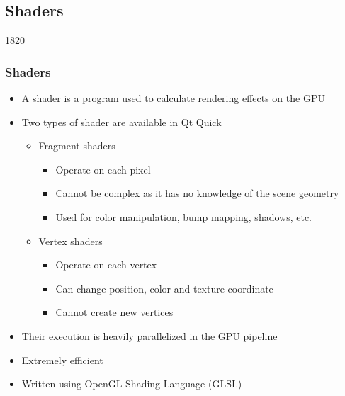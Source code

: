 %
%
%
%

\subsection{Shaders}


\begin{slide}{1820}\frametitle{Shaders}

\begin{itemize}
\item A shader is a program used to calculate rendering effects on the GPU
\vspace*{1em}
\item Two types of shader are available in Qt Quick
  \begin{itemize}
  \vspace*{0.5em}
  \item Fragment shaders
    \begin{itemize}
    \item Operate on each pixel
    \item Cannot be complex as it has no knowledge of the scene geometry
    \item Used for color manipulation, bump mapping, shadows, etc.
    \end{itemize}
  \vspace*{0.5em}
  \item Vertex shaders
    \begin{itemize}
    \item Operate on each vertex
    \item Can change position, color and texture coordinate
    \item Cannot create new vertices
    \end{itemize}
  \end{itemize}
\vspace*{1em}
\item Their execution is heavily parallelized in the GPU pipeline
\item Extremely efficient
\item Written using OpenGL Shading Language (GLSL)
\end{itemize}

\end{slide}

